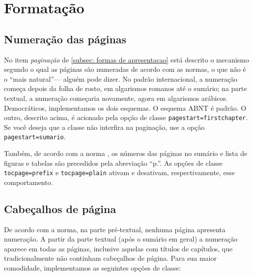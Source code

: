 \documentclass[espaco=simples,appendix=Name]{abnt}
\newcommand{\abnt}{{\smaller ABNT}}%
\newcommand{\itemnorma}[1]{\textit{#1}}
\begin{document}
\chapter{Formatação}

\section{Numeração das páginas}\label{subsec: numeracao das paginas}

No item \itemnorma{paginação} de \ref{subsec: formas de apresentacao} está
descrito o mecanismo segundo o qual as páginas são numeradas de acordo com as
normas, o que não é o ``mais natural''--- alguém pode
dizer. No padrão internacional, a numeração começa depois da 
folha de rosto, em algarismos romanos até o sumário; na parte textual, a
numeração começaria novamente, agora em algarismos arábicos. Democráticos,
implementamos os dois esquemas. O esquema \abnt{} é padrão. O outro, descrito
acima, é acionado pela opção de classe \texttt{pagestart=firstchapter}. Se você deseja
que a classe não interfira na paginação, use a opção \texttt{pagestart=sumario}.

Também, de acordo com a norma \cite{NBR6027:1989}, os números das páginas
no sumário e lista de figuras e tabelas são precedidos pela abreviação
``p.''. As opções de classe \texttt{tocpage=prefix} e \texttt{tocpage=plain}
ativam e desativam, respectivamente, esse comportamento.


\section{Cabeçalhos de página}\label{subsec: cabecalhos de paginas}

De acordo com a norma, na parte pré-textual, nenhuma página apresenta
numeração. A partir da parte textual (após o sumário em geral) a numeração
aparece em todas as páginas, inclusive aquelas com títulos de capítulos,
que tradicionalmente não continham cabeçalhos de página. Para sua maior
comodidade, implementamos as seguintes opções de classe:
\end{document}
